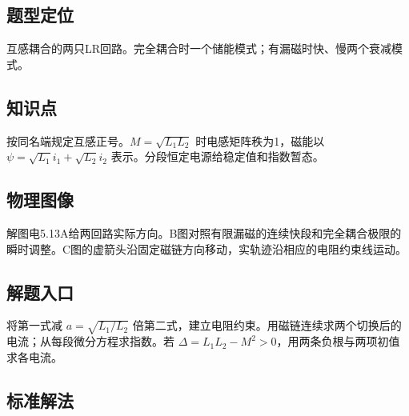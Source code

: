 \documentclass[UTF8,fontset=fandol,a4paper,11pt]{ctexart}
\begin{document}


\subsection*{题型定位}

互感耦合的两只LR回路。完全耦合时一个储能模式；有漏磁时快、慢两个衰减模式。



\subsection*{知识点}

按同名端规定互感正号。$M=\sqrt{L_1L_2}$ 时电感矩阵秩为1，磁能以 $\psi=\sqrt{L_1}i_1+\sqrt{L_2}i_2$ 表示。分段恒定电源给稳定值和指数暂态。



\subsection*{物理图像}

解图电5.13A给两回路实际方向。B图对照有限漏磁的连续快段和完全耦合极限的瞬时调整。C图的虚箭头沿固定磁链方向移动，实轨迹沿相应的电阻约束线运动。



\subsection*{解题入口}

将第一式减 $a=\sqrt{L_1/L_2}$ 倍第二式，建立电阻约束。用磁链连续求两个切换后的电流；从每段微分方程求指数。若 $\Delta=L_1L_2-M^2>0$，用两条负根与两项初值求各电流。


\subsection*{标准解法}
\end{document}
